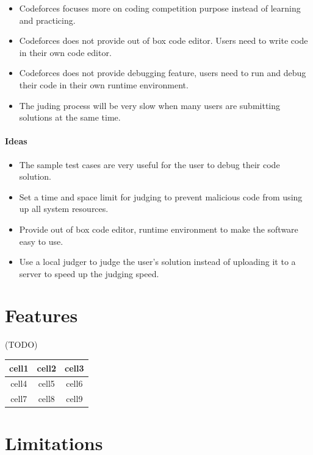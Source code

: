 \documentclass[a4paper]{report}
\begin{document}
\begin{itemize}
    \item Codeforces focuses more on coding competition purpose instead of learning and practicing.
    \item Codeforces does not provide out of box code editor. Users need to write code in their own code editor.
    \item Codeforces does not provide debugging feature, users need to run and debug their code in their own runtime environment.
    \item The juding process will be very slow when many users are submitting solutions at the same time.
\end{itemize}

\paragraph{Ideas}

\begin{itemize}
    \item The sample test cases are very useful for the user to debug their code solution.
    \item Set a time and space limit for judging to prevent malicious code from using up all system resources.
    \item Provide out of box code editor, runtime environment to make the software easy to use.
    \item Use a local judger to judge the user's solution instead of uploading it to a server to speed up the judging speed. 
\end{itemize}

\section{Features}

(TODO)

\begin{center}
\begin{tabular}{ |c|c|c| } 
 \hline
 cell1 & cell2 & cell3 \\ 
  \hline
 cell4 & cell5 & cell6 \\ 
  \hline
 cell7 & cell8 & cell9 \\ 
 \hline
\end{tabular}
\end{center}

\section{Limitations}
\end{document}
